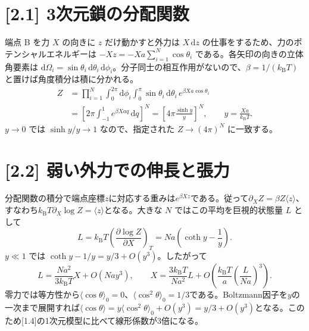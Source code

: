 \documentclass[11pt,a4paper]{article}
\begin{document}
\section*{[2.1] 3次元鎖の分配関数}
端点 B を力 $X$ の向きに $z$ だけ動かすと外力は $X\,\mathrm dz$ の仕事をするため、力のポテンシャルエネルギーは $-Xz=-Xa\sum_{i=1}^N\cos\theta_i$ である。各矢印の向きの立体角要素は $\mathrm d\Omega_i=\sin\theta_i\,\mathrm d\theta_i\,\mathrm d\phi_i$。分子同士の相互作用がないので、$\beta=1/(k_{\mathrm B}T)$ と置けば角度積分は積に分かれる。
\begin{align*}
Z&=\prod_{i=1}^{N}\int_0^{2\pi}\!\mathrm d\phi_i
\int_0^\pi\!\sin\theta_i\,\mathrm d\theta_i\,
e^{\beta Xa\cos\theta_i}\\
&=\left[2\pi\int_{-1}^{1}e^{\beta Xa q}\,\mathrm dq\right]^N
=\boxed{\left[4\pi\frac{\sinh y}{y}\right]^N},
\qquad y=\frac{Xa}{k_{\mathrm B}T}.
\end{align*}
$y\to0$ では $\sinh y/y\to1$ なので、指定された $Z\to(4\pi)^N$ に一致する。

\section*{[2.2] 弱い外力での伸長と張力}
分配関数の積分で端点座標$z$に対応する重みは$e^{\beta Xz}$である。従って$\partial_X Z=\beta Z\langle z\rangle$、すなわち$k_{\mathrm B}T\partial_X\log Z=\langle z\rangle$となる。大きな $N$ ではこの平均を巨視的状態量 $L$ として
\[
L=k_{\mathrm B}T\left(\frac{\partial\log Z}{\partial X}\right)_T
=Na\left(\coth y-\frac1y\right).
\]
$y\ll1$ では $\coth y-1/y=y/3+O(y^3)$。したがって
\[
L=\frac{Na^2}{3k_{\mathrm B}T}X+O(Na y^3),
\qquad
\boxed{X=\frac{3k_{\mathrm B}T}{Na^2}L
+O\!\left(\frac{k_{\mathrm B}T}{a}
\left(\frac{L}{Na}\right)^3\right)}.
\]
零力では等方性から$\langle\cos\theta\rangle_0=0$、$\langle\cos^2\theta\rangle_0=1/3$である。Boltzmann因子を$y$の一次まで展開すれば$\langle\cos\theta\rangle=y\langle\cos^2\theta\rangle_0+O(y^3)=y/3+O(y^3)$となる。このため[1.4]の1次元模型に比べて線形係数が3倍になる。
\end{document}
